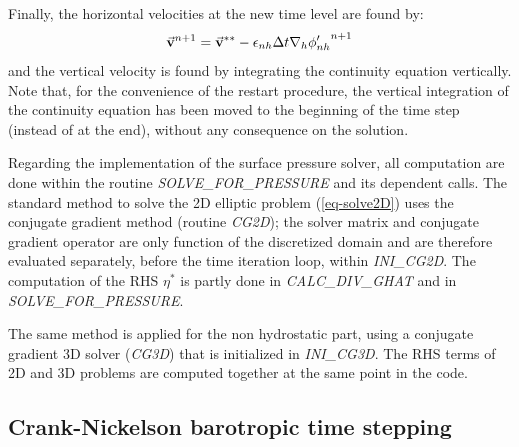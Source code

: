 Finally, the horizontal velocities at the new time level are found by:
\begin{equation}
\vec{\bf v}^{n+1} = \vec{\bf v}^{**}
- \epsilon_{nh} \Delta t {\bf \nabla}_h {\phi'_{nh}}^{n+1}
\end{equation}
and the vertical velocity is found by integrating the continuity
equation vertically.  Note that, for the convenience of the restart
procedure, the vertical integration of the continuity equation has
been moved to the beginning of the time step (instead of at the end),
without any consequence on the solution.




Regarding the implementation of the surface pressure solver, all
computation are done within the routine {\it SOLVE\_FOR\_PRESSURE} and
its dependent calls.  The standard method to solve the 2D elliptic
problem (\ref{eq-solve2D}) uses the conjugate gradient method (routine
{\it CG2D}); the solver matrix and conjugate gradient operator are
only function of the discretized domain and are therefore evaluated
separately, before the time iteration loop, within {\it INI\_CG2D}.
The computation of the RHS $\eta^*$ is partly done in {\it
CALC\_DIV\_GHAT} and in {\it SOLVE\_FOR\_PRESSURE}.

The same method is applied for the non hydrostatic part, using a
conjugate gradient 3D solver ({\it CG3D}) that is initialized in {\it
INI\_CG3D}. The RHS terms of 2D and 3D problems are computed together
at the same point in the code.



\subsection{Crank-Nickelson barotropic time stepping}
\label{sec:freesurf-CrankNick}

